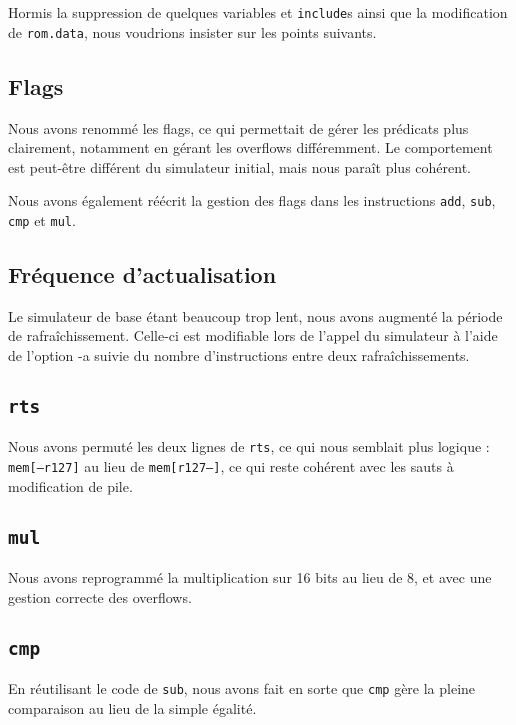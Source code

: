 \documentclass{article}
\begin{document}
Hormis la suppression de quelques variables et {\tt include}s ainsi que la modification de {\tt rom.data}, nous voudrions insister sur les points suivants.

\subsection{Flags}

Nous avons renommé les flags, ce qui permettait de gérer les prédicats plus clairement, notamment en gérant les overflows différemment. Le comportement est peut-être différent du simulateur initial, mais nous paraît plus cohérent.

Nous avons également réécrit la gestion des flags dans les instructions {\tt add}, {\tt sub}, {\tt cmp} et {\tt mul}.

\subsection{Fréquence d'actualisation}
 
 Le simulateur de base étant beaucoup trop lent, nous avons augmenté la période de rafraîchissement. Celle-ci est modifiable lors de l'appel du simulateur à l'aide de l'option -a suivie du nombre d'instructions entre deux rafraîchissements. 
 
\subsection{\tt rts}

Nous avons permuté les deux lignes de {\tt rts}, ce qui nous semblait plus logique : {\tt mem[--r127]} au lieu de {\tt mem[r127--]}, ce qui reste cohérent avec les sauts à modification de pile.

\subsection{\tt mul}

Nous avons reprogrammé la multiplication sur 16 bits au lieu de 8, et avec une gestion correcte des overflows.

\subsection{\tt cmp}

En réutilisant le code de {\tt sub}, nous avons fait en sorte que {\tt cmp} gère la pleine comparaison au lieu de la simple égalité.
\end{document}
